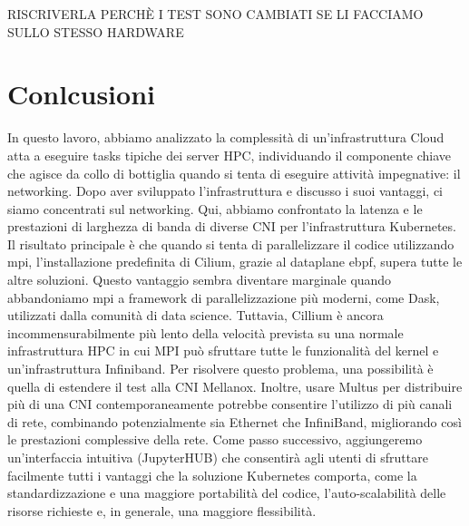 RISCRIVERLA PERCHÈ  I TEST SONO CAMBIATI SE LI FACCIAMO SULLO STESSO HARDWARE


\section*{Conlcusioni}

In questo lavoro, abbiamo analizzato la complessità di un'infrastruttura Cloud
atta a eseguire tasks tipiche dei server HPC, individuando il componente chiave
che agisce da collo di bottiglia quando si tenta di eseguire attività
impegnative: il networking.
Dopo aver sviluppato l'infrastruttura e discusso i suoi vantaggi, ci siamo
concentrati sul networking.
Qui, abbiamo confrontato la latenza e le prestazioni di larghezza di banda di
diverse CNI per l'infrastruttura Kubernetes.
Il risultato principale è che quando si tenta di parallelizzare il codice
utilizzando mpi, l'installazione predefinita di Cilium, grazie al dataplane
ebpf, supera tutte le altre soluzioni.
Questo vantaggio sembra diventare marginale quando abbandoniamo mpi a framework
di parallelizzazione più moderni, come Dask, utilizzati dalla comunità di data
science.
Tuttavia, Cillium è ancora incommensurabilmente più lento della velocità
prevista su una normale infrastruttura HPC in cui MPI può sfruttare tutte le
funzionalità del kernel e un'infrastruttura Infiniband.
Per risolvere questo problema, una possibilità è quella di estendere il test
alla CNI Mellanox. Inoltre, usare Multus per distribuire più di una CNI
contemporaneamente potrebbe consentire l'utilizzo di più canali di rete,
combinando potenzialmente sia Ethernet che InfiniBand, migliorando così le
prestazioni complessive della rete.
Come passo successivo, aggiungeremo un'interfaccia intuitiva (JupyterHUB) che
consentirà agli utenti di sfruttare facilmente tutti i vantaggi che la soluzione
Kubernetes comporta, come la standardizzazione e una maggiore portabilità del
codice, l'auto-scalabilità delle risorse richieste e, in generale, una maggiore
flessibilità.
